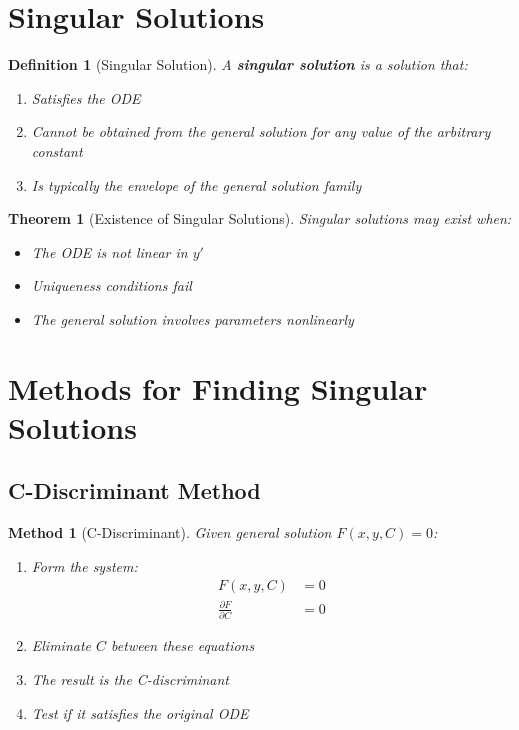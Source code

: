 \documentclass[12pt]{article}
\newtheorem{definition}{Definition}
\newtheorem{theorem}{Theorem}
\newtheorem{method}{Method}
\begin{document}
\section{Singular Solutions}

\begin{definition}[Singular Solution]
A \textbf{singular solution} is a solution that:
\begin{enumerate}
    \item Satisfies the ODE
    \item Cannot be obtained from the general solution for any value of the arbitrary constant
    \item Is typically the envelope of the general solution family
\end{enumerate}
\end{definition}

\begin{theorem}[Existence of Singular Solutions]
Singular solutions may exist when:
\begin{itemize}
    \item The ODE is not linear in $y'$
    \item Uniqueness conditions fail
    \item The general solution involves parameters nonlinearly
\end{itemize}
\end{theorem}

\section{Methods for Finding Singular Solutions}

\subsection{C-Discriminant Method}

\begin{method}[C-Discriminant]
Given general solution $F(x,y,C) = 0$:
\begin{enumerate}
    \item Form the system:
    \begin{align}
    F(x,y,C) &= 0\\
    \frac{\partial F}{\partial C} &= 0
    \end{align}
    \item Eliminate $C$ between these equations
    \item The result is the C-discriminant
    \item Test if it satisfies the original ODE
\end{enumerate}
\end{method}
\end{document}

